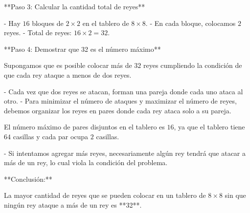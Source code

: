 \documentclass[11pt]{scrartcl}
\begin{document}
\begin{problem}
\begin{hint}
\begin{solu}
**Paso 3: Calcular la cantidad total de reyes**

- Hay $16$ bloques de $2 \times 2$ en el tablero de $8 \times 8$.
- En cada bloque, colocamos $2$ reyes.
- Total de reyes: $16 \times 2 = 32$.

**Paso 4: Demostrar que 32 es el número máximo**

Supongamos que es posible colocar más de $32$ reyes cumpliendo la condición de que cada rey ataque a menos de dos reyes.

- Cada vez que dos reyes se atacan, forman una pareja donde cada uno ataca al otro.
- Para minimizar el número de ataques y maximizar el número de reyes, debemos organizar los reyes en pares donde cada rey ataca solo a su pareja.

El número máximo de pares disjuntos en el tablero es $16$, ya que el tablero tiene $64$ casillas y cada par ocupa $2$ casillas.

- Si intentamos agregar más reyes, necesariamente algún rey tendrá que atacar a más de un rey, lo cual viola la condición del problema.

**Conclusión:**

La mayor cantidad de reyes que se pueden colocar en un tablero de $8 \times 8$ sin que ningún rey ataque a más de un rey es **32**.

\end{solu}
\end{hint}
\end{problem}
\end{document}
